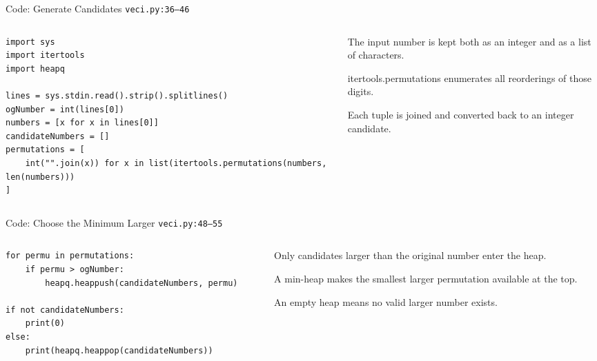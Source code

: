 \documentclass[aspectratio=169,11pt]{beamer}
\begin{document}
\begin{frame}[fragile]{Code: Generate Candidates}
\scriptsize
{} \texttt{veci.py:36--46}

\vspace{0.08cm}
\begin{columns}[T,totalwidth=\textwidth]
\begin{column}{0.58\textwidth}
\begin{lstlisting}[style=cpcode]
import sys
import itertools
import heapq

lines = sys.stdin.read().strip().splitlines()
ogNumber = int(lines[0])
numbers = [x for x in lines[0]]
candidateNumbers = []
permutations = [
    int("".join(x)) for x in list(itertools.permutations(numbers, len(numbers)))
]
\end{lstlisting}
\end{column}
\begin{column}{0.38\textwidth}
\begin{tightitemize}
  \item The input number is kept both as an integer and as a list of characters.
  \item itertools.permutations enumerates all reorderings of those digits.
  \item Each tuple is joined and converted back to an integer candidate.
\end{tightitemize}
\end{column}
\end{columns}
\end{frame}

\begin{frame}[fragile]{Code: Choose the Minimum Larger}
\scriptsize
{} \texttt{veci.py:48--55}

\vspace{0.08cm}
\begin{columns}[T,totalwidth=\textwidth]
\begin{column}{0.58\textwidth}
\begin{lstlisting}[style=cpcode]
for permu in permutations:
    if permu > ogNumber:
        heapq.heappush(candidateNumbers, permu)

if not candidateNumbers:
    print(0)
else:
    print(heapq.heappop(candidateNumbers))
\end{lstlisting}
\end{column}
\begin{column}{0.38\textwidth}
\begin{tightitemize}
  \item Only candidates larger than the original number enter the heap.
  \item A min-heap makes the smallest larger permutation available at the top.
  \item An empty heap means no valid larger number exists.
\end{tightitemize}
\end{column}
\end{columns}
\end{frame}
\end{document}
